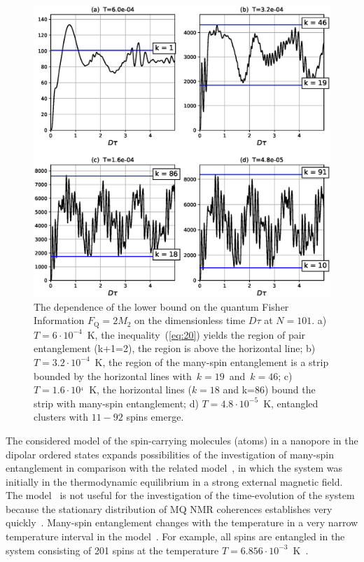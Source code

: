 \documentclass[review]{elsarticle}
\begin{document}
\begin{figure}
  	\includegraphics[width=0.95\linewidth]{fisher_low_bound_n101.eps}
	\caption{
	    The dependence of the lower bound on the quantum Fisher Information $F_\mathrm{Q} = 2 M_{2}$ 
	    on the dimensionless time $D\tau$ at $N=101$.
	    a) $T=6\cdot10^{-4}$~K, the inequality~(\ref{eq:20}) yields the region of pair entanglement (k+1=2), the region is above the horizontal line; 
	    b) $T=3.2\cdot10^{-4}$~K, the region of the many-spin entanglement is a strip bounded by the horizontal lines with~$k=19$~and~$k=46$; 
	    c) $T = 1.6\cdot10^{_4}$~K, the horizontal lines ($k=18$ and k=$86$) bound the strip with many-spin entanglement;
	    d) $T=4.8\cdot10^{-5}$~K, entangled clusters with $11-92$ spins emerge.
	}
	\label{fig:2}
\end{figure}

The considered model of the spin-carrying molecules (atoms) in a nanopore in the dipolar ordered states expands possibilities of the investigation of many-spin entanglement in comparison with the related model~\cite{Doronin_2019},
in which the system was initially in the thermodynamic equilibrium in a strong external magnetic field.
The model~\cite{Doronin_2019}  is not useful for the investigation of the time-evolution of the system
because the stationary distribution of MQ NMR coherences establishes very quickly~\cite{Doronin_2009}.
Many-spin entanglement changes with the temperature in a very narrow temperature interval in the model~\cite{Doronin_2019}.
For example, all spins are entangled in the system consisting of 201 spins at the temperature $T=6.856\cdot10^{-3}$~K~\cite{Doronin_2019}.
\end{document}
